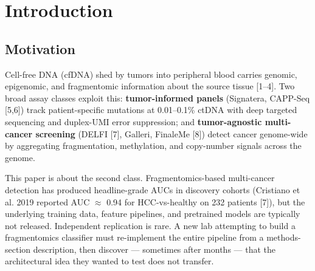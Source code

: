 \documentclass[11pt]{article}
\begin{document}
\begin{abstract}
\textbf{Conclusions.} DeepCatch is not a clinical assay. It is a reproducible fragmentomics engineering substrate: it lets a researcher swap in a new cohort, a new modality, or a new fusion head and get honest numbers in hours rather than months. The framework is most useful for negative results --- telling investigators which architectural ideas do NOT help on open data before they spend real-plasma budget on them.

\par\bigskip\hrule\bigskip
\end{abstract}
\section{Introduction}
\subsection{Motivation}
Cell-free DNA (cfDNA) shed by tumors into peripheral blood carries genomic, epigenomic, and fragmentomic information about the source tissue [1--4]. Two broad assay classes exploit this: \textbf{tumor-informed panels} (Signatera, CAPP-Seq [5,6]) track patient-specific mutations at 0.01--0.1\% ctDNA with deep targeted sequencing and duplex-UMI error suppression; and \textbf{tumor-agnostic multi-cancer screening} (DELFI [7], Galleri, FinaleMe [8]) detect cancer genome-wide by aggregating fragmentation, methylation, and copy-number signals across the genome.

This paper is about the second class. Fragmentomics-based multi-cancer detection has produced headline-grade AUCs in discovery cohorts (Cristiano et al. 2019 reported AUC $\approx$ 0.94 for HCC-vs-healthy on 232 patients [7]), but the underlying training data, feature pipelines, and pretrained models are typically not released. Independent replication is rare. A new lab attempting to build a fragmentomics classifier must re-implement the entire pipeline from a methods-section description, then discover --- sometimes after months --- that the architectural idea they wanted to test does not transfer.
\end{document}
